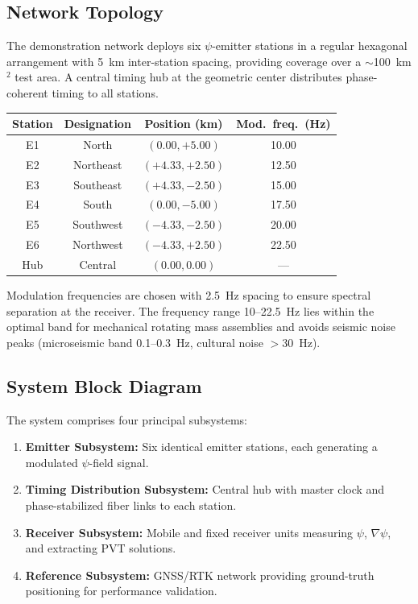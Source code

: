 \documentclass[11pt,a4paper]{article}
\begin{document}
\subsection{Network Topology}

The demonstration network deploys six $\psi$-emitter stations in a
regular hexagonal arrangement with 5~km inter-station spacing,
providing coverage over a $\sim$100~km$^2$ test area. A central timing
hub at the geometric center distributes phase-coherent timing to all
stations.

\begin{center}
\begin{tabular}{cccc}
\toprule
\textbf{Station} & \textbf{Designation} & \textbf{Position (km)} & \textbf{Mod.\ freq.\ (Hz)} \\
\midrule
E1 & North & $(0.00, +5.00)$ & 10.00 \\
E2 & Northeast & $(+4.33, +2.50)$ & 12.50 \\
E3 & Southeast & $(+4.33, -2.50)$ & 15.00 \\
E4 & South & $(0.00, -5.00)$ & 17.50 \\
E5 & Southwest & $(-4.33, -2.50)$ & 20.00 \\
E6 & Northwest & $(-4.33, +2.50)$ & 22.50 \\
Hub & Central & $(0.00, 0.00)$ & --- \\
\bottomrule
\end{tabular}
\end{center}

Modulation frequencies are chosen with 2.5~Hz spacing to ensure
spectral separation at the receiver. The frequency range 10--22.5~Hz
lies within the optimal band for mechanical rotating mass assemblies
and avoids seismic noise peaks (microseismic band 0.1--0.3~Hz,
cultural noise $>30$~Hz).

\subsection{System Block Diagram}

The system comprises four principal subsystems:
\begin{enumerate}
\item \textbf{Emitter Subsystem:} Six identical emitter stations, each
  generating a modulated $\psi$-field signal.
\item \textbf{Timing Distribution Subsystem:} Central hub with master
  clock and phase-stabilized fiber links to each station.
\item \textbf{Receiver Subsystem:} Mobile and fixed receiver units
  measuring $\psi$, $\nabla\psi$, and extracting PVT solutions.
\item \textbf{Reference Subsystem:} GNSS/RTK network providing
  ground-truth positioning for performance validation.
\end{enumerate}
\end{document}
